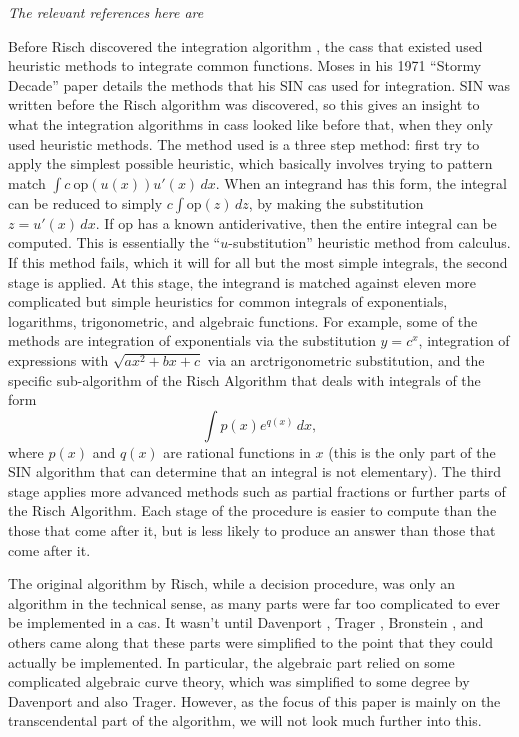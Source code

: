 \emph{The relevant references here
are~\cite{moses1971symbolic,risch1969problem}}

Before Risch discovered the \gls{integration} algorithm
\cite{risch1969problem}, the \glspl{cas} that existed used heuristic
methods to integrate common functions. Moses in his 1971 ``Stormy
Decade'' paper \cite{moses1971symbolic} details the methods that his SIN
\gls{cas} used for integration. SIN was written before the Risch
algorithm was discovered, so this gives an insight to what the
integration algorithms in \glspl{cas} looked like before that, when they
only used heuristic methods.  The method used is a three step method:
first try to apply the simplest possible heuristic, which basically
involves trying to pattern match $\int{c\ \mathrm{op}(u(x))u'(x)\,dx}$.
When an \gls{integrand} has this form, the integral can be reduced to
simply $c\int{\mathrm{op}(z)\,dz}$, by making the substitution
$z=u'(x)\,dx$.  If $\mathrm{op}$ has a known antiderivative, then the
entire integral can be computed.  This is essentially the
``$u$-substitution'' heuristic method from calculus.  If this method
fails, which it will for all but the most simple integrals, the second
stage is applied.  At this stage, the \gls{integrand} is matched against
eleven more complicated but simple heuristics for common integrals of
exponentials, logarithms, trigonometric, and \gls{algebraic} functions.  For
example, some of the methods are \gls{integration} of exponentials via the
substitution $y=c^x$, integration of expressions with $\sqrt{ax^2 + bx +
c}$ via an arc\-trig\-o\-no\-met\-ric substitution, and the specific
sub-algorithm of the Risch Algorithm that deals with integrals of the
form
\begin{equation}
\label{SIN exponential form}
\int{p(x)e^{q(x)}\,dx},
\end{equation}
where $p(x)$ and $q(x)$ are
\glspl{rational function} in $x$ (this is the only part of the SIN
algorithm that can determine that an integral is not \gls{elementary}).
The third stage applies more advanced methods such as partial fractions
or further parts of the Risch Algorithm.  Each stage of the procedure is
easier to compute than the those that come after it, but is less likely
to produce an answer than those that come after it.

The original algorithm by Risch, while a decision procedure, was only an
algorithm in the technical sense, as many parts were far too complicated
to ever be implemented in a \gls{cas}.  It wasn't until Davenport
\cite{davenport1984integration}, Trager \cite{trager1984integration},
Bronstein \cite{bronstein2005symbolic}, and others came along that
these parts were simplified to the point that they could actually be
implemented.  In particular, the \gls{algebraic} part relied on some
complicated algebraic curve theory, which was simplified to some degree
by Davenport and also Trager.  However, as the focus of this paper is
mainly on the \gls{transcendental} part of the algorithm, we will not
look much further into this.  